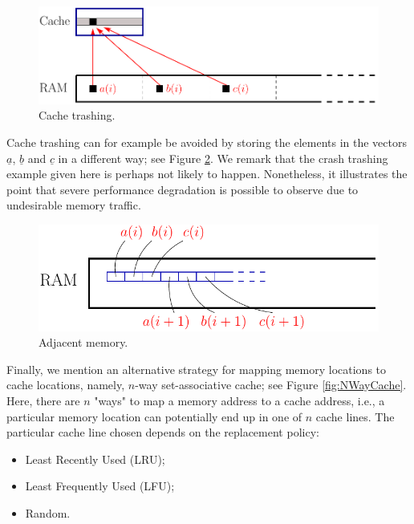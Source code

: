 \documentclass[11pt]{article}
\begin{document}
\begin{figure}[htbp]
  \begin{center}
    \includegraphics[scale=0.85]{CacheTrashing}
  \end{center}
  \caption{Cache trashing. 
}
\label{fig:CacheTrashing}
\end{figure}

\newpage
Cache trashing can for example be avoided by storing the elements in the 
vectors $\underline{a}$, $\underline{b}$ and $\underline{c}$ in a different way; 
see Figure \ref{fig:AdjacentMemory}. We remark that the crash trashing 
example given here is perhaps not likely to happen. Nonetheless, 
it illustrates the point that severe performance degradation is possible to 
observe  due to undesirable memory traffic. 
\vspace{.5cm}

\begin{figure}[htbp]
  \begin{center}
    \includegraphics[scale=0.9]{AdjacentMemory}
  \end{center}
  \caption{Adjacent memory. 
}
\label{fig:AdjacentMemory}
\end{figure}
\vspace{.5cm}

Finally, we mention an alternative strategy for mapping memory locations 
to cache locations, namely, $n$-way set-associative cache; 
see Figure \ref{fig:NWayCache}.
Here, there are $n$ "ways" to map a memory address to a cache address, 
i.e., a particular memory location can potentially end up in one of $n$ cache lines. 
The particular cache line chosen depends on the replacement policy: 
\begin{itemize}
\item Least Recently Used (LRU);
\item Least Frequently Used (LFU);
\item Random. 
\end{itemize}
\end{document}
